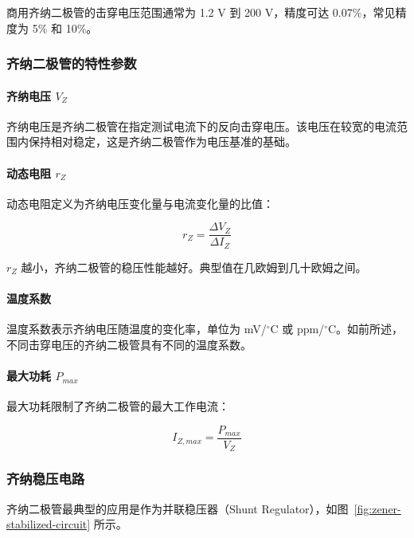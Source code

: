商用齐纳二极管的击穿电压范围通常为 1.2 V 到 200 V，精度可达 0.07\%，常见精度为 5\% 和 10\%。

\subsubsection{齐纳二极管的特性参数}

\paragraph{齐纳电压 $V_Z$}

齐纳电压是齐纳二极管在指定测试电流下的反向击穿电压。该电压在较宽的电流范围内保持相对稳定，这是齐纳二极管作为电压基准的基础。

\paragraph{动态电阻 $r_Z$}

动态电阻定义为齐纳电压变化量与电流变化量的比值：

\begin{equation}
r_Z = \frac{\Delta V_Z}{\Delta I_Z} \label{eq:zener-resistance}
\end{equation}

$r_Z$ 越小，齐纳二极管的稳压性能越好。典型值在几欧姆到几十欧姆之间。

\paragraph{温度系数}

温度系数表示齐纳电压随温度的变化率，单位为 mV/$^\circ$C 或 ppm/$^\circ$C。如前所述，不同击穿电压的齐纳二极管具有不同的温度系数。

\paragraph{最大功耗 $P_{max}$}

最大功耗限制了齐纳二极管的最大工作电流：

\begin{equation}
I_{Z,max} = \frac{P_{max}}{V_Z} \label{eq:zener-max-current}
\end{equation}

\subsubsection{齐纳稳压电路}

齐纳二极管最典型的应用是作为并联稳压器（Shunt Regulator），如图~\ref{fig:zener-stabilized-circuit} 所示。

